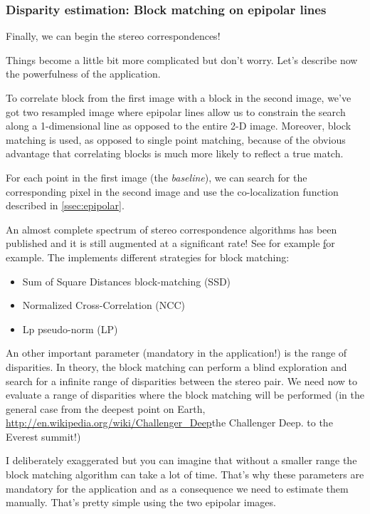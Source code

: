 \subsubsection{Disparity estimation: Block matching on epipolar lines}

Finally, we can begin the stereo correspondences!

Things become a little bit more complicated but don't worry. Let's describe
now the powerfulness of the  application.

To correlate block from the first image with a block in the second image, we've
got two resampled image where epipolar lines allow us to constrain the
search along a 1-dimensional line as opposed to the entire 2-D
image. Moreover, block matching is used, as opposed to single point matching,
because of the obvious advantage that correlating blocks is much more likely to
reflect a true match.

For each point in the first image (the \textit{baseline}), we can search for the
corresponding pixel in the second image and use the co-localization function
described in \ref{ssec:epipolar}.

An almost complete spectrum of stereo correspondence algorithms has been
published and it is still augmented at a significant rate!
See for example \href{http://en.wikipedia.org/wiki/Block-matching_algorithm} for example. The
\otb implements different strategies for block matching:

\begin{itemize}
\item Sum of Square Distances block-matching (SSD)
\item Normalized Cross-Correlation (NCC)
\item Lp pseudo-norm (LP)
\end{itemize}

An other important parameter (mandatory in the application!) is the range of
disparities. In theory, the block matching can perform a blind exploration and
search for a infinite range of disparities between the stereo pair. We need now
to evaluate a range of disparities where the block matching will be performed (in the general case from the deepest point on
Earth, \url{http://en.wikipedia.org/wiki/Challenger_Deep}{the Challenger Deep}.
to the Everest summit!)

I deliberately exaggerated but you can imagine that without a smaller range 
the block matching algorithm can take a lot of time.  That's why
these parameters are mandatory for the application and as a consequence we need to
estimate them manually. That's pretty simple using the two epipolar images.

